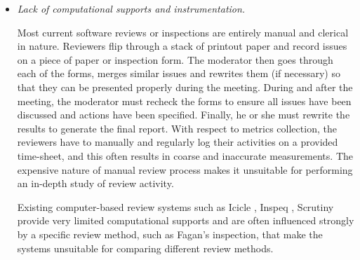 \begin {itemize}
\item {\sl Lack of computational supports and instrumentation.}

Most current software reviews or inspections are entirely manual and
clerical in nature. Reviewers flip through a stack of printout paper
and record issues on a piece of paper or inspection form. The
moderator then goes through each of the forms, merges similar issues
and rewrites them (if necessary) so that they can be presented
properly during the meeting. During and after the meeting, the
moderator must recheck the forms to ensure all issues have been
discussed and actions have been specified.  Finally, he or she must
rewrite the results to generate the final report.  With respect to
metrics collection, the reviewers have to manually and regularly log
their activities on a provided time-sheet, and this often results in
coarse and inaccurate measurements.  The expensive nature of manual
review process makes it unsuitable for performing an in-depth study of
review activity.

Existing computer-based review systems such as Icicle
\cite{Brothers90}, Inspeq \cite{Knight91}, Scrutiny \cite{Gintell93}
provide very limited computational supports and are often influenced
strongly by a specific review method, such as Fagan's inspection, that
make the systems unsuitable for comparing different review methods.

\end {itemize}

